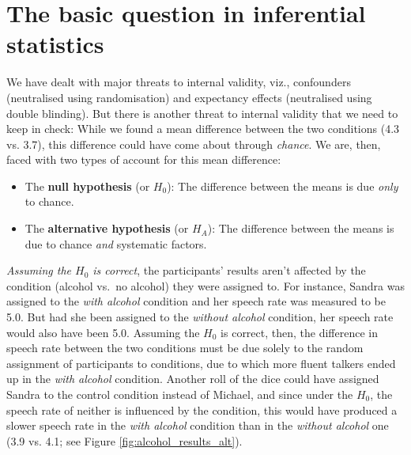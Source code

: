 \documentclass[a4paper]{tufte-book}\usepackage[]{graphicx}\usepackage[]{xcolor}
\newcommand{\term}[1]{\textbf{#1}}
\begin{document}
\section{The basic question in inferential statistics}
We have dealt with major threats to internal validity, viz.,
confounders (neutralised using randomisation)
and expectancy effects (neutralised using double blinding).
But there is another threat to internal validity that we need
to keep in check:
While we found a mean difference between the two conditions (4.3 vs. 3.7),
this difference could have come about through \emph{chance}.
We are, then, faced with two types of account for this mean difference:

\begin{itemize}
  \item The \term{null hypothesis} (or $H_0$):
  The difference between the means is due \emph{only} to chance.

  \item The \term{alternative hypothesis} (or $H_A$):
  The difference between the means is due to chance \emph{and} systematic factors.
\end{itemize}

\emph{Assuming the $H_0$ is correct},
the participants' results aren't affected by the condition (alcohol vs.\ no alcohol)
they were assigned to. For instance,
Sandra was assigned to the \textit{with alcohol} condition
and her speech rate was measured to be 5.0.
But had she been assigned to the \textit{without alcohol} condition,
her speech rate would also have been 5.0.
Assuming the $H_0$ is correct, then, the difference in speech rate between the two
conditions
must be due solely to the random assignment of
participants to conditions, due to which more fluent talkers
ended up in the \textit{with alcohol} condition.
Another roll of the dice could have assigned Sandra
to the control condition instead of Michael,
and since under the $H_0$, the speech rate of neither is influenced
by the condition, this would have
produced a slower speech rate in the \textit{with alcohol} condition than in the
\textit{without alcohol} one (3.9 vs. 4.1; see Figure \ref{fig:alcohol_results_alt}).
\end{document}
